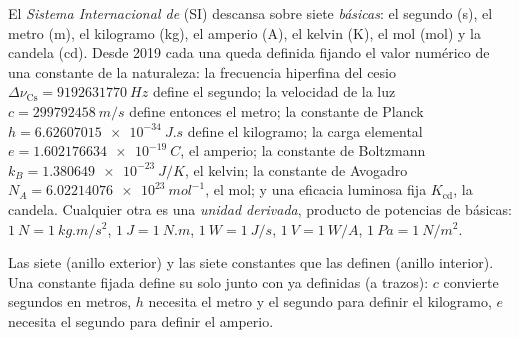 \begin{definition}\label{def:b1:units-dimensions:si}
El \emph{Sistema Internacional de } (SI) descansa sobre siete
\emph{ básicas}: el segundo (\unit{s}), el metro (\unit{m}), el
kilogramo (\unit{kg}), el amperio (\unit{A}), el kelvin (\unit{K}), el
mol (\unit{mol}) y la candela (\unit{cd}). Desde 2019 cada una queda
definida fijando el valor numérico de una constante de la naturaleza: la
frecuencia hiperfina del cesio $\Delta\nu_{\mathrm{Cs}} = \qty{9192631770}{Hz}$
define el segundo; la velocidad de la luz $c = \qty{299792458}{m/s}$
define entonces el metro; la constante de Planck
$h = \qty{6.62607015e-34}{J.s}$ define el kilogramo; la carga elemental
$e = \qty{1.602176634e-19}{C}$, el amperio; la constante de Boltzmann
$k_B = \qty{1.380649e-23}{J/K}$, el kelvin; la constante de Avogadro
$N_A = \qty{6.02214076e23}{mol^{-1}}$, el mol; y una eficacia luminosa
fija $K_{\mathrm{cd}}$, la candela. Cualquier otra  es una
\emph{unidad derivada}, producto de potencias de
 básicas: $\qty{1}{N} = \qty{1}{kg.m/s^2}$, $\qty{1}{J} = \qty{1}{N.m}$,
$\qty{1}{W} = \qty{1}{J/s}$, $\qty{1}{V} = \qty{1}{W/A}$,
$\qty{1}{Pa} = \qty{1}{N/m^2}$.
\end{definition}

\begin{omfigure}

{\small Las siete  (anillo exterior) y las siete
constantes que las definen (anillo interior). Una constante fijada define
su  solo junto con  ya definidas (a trazos): $c$ convierte
segundos en metros, $h$ necesita el metro y el segundo para definir el
kilogramo, $e$ necesita el segundo para definir el amperio.}
\end{omfigure}

